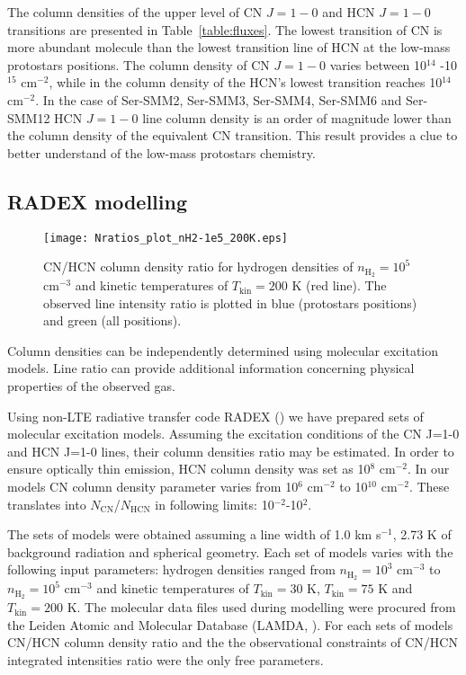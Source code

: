 \documentclass{aa}
\begin{document}
The column densities of the upper level of CN $J=1-0$ and HCN $J=1-0$ transitions are presented in Table~\ref{table:fluxes}. The lowest transition of CN is more abundant molecule than the lowest transition line of HCN at the low-mass protostars positions. The column density of CN $J=1-0$ varies between 10$^{14}$ -10$^{15}$ cm$^{-2}$, while in the column density of the HCN’s lowest transition reaches 10$^{14}$ cm$^{-2}$. In the case of Ser-SMM2, Ser-SMM3, Ser-SMM4, Ser-SMM6 and Ser-SMM12 HCN $J=1-0$ line column density is an order of magnitude lower than the column density of the equivalent CN transition. This result provides a clue to better understand of the low-mass protostars chemistry. 

\subsection{RADEX modelling}

\begin{figure}
   \centering
   \texttt{[image: Nratios\_plot\_nH2-1e5\_200K.eps]}
      \caption{CN/HCN column density ratio for hydrogen densities of $n_\mathrm{H_2} = 10^5$ cm$^{-3}$ and kinetic temperatures of $T_\mathrm{kin} = 200$ K (red line). The observed line intensity ratio is plotted in blue (protostars positions) and green (all positions).}
         \label{1e5_75K}
\end{figure}

Column densities can be independently determined using molecular excitation models. Line ratio can provide additional information concerning physical properties of the observed gas. 

Using non-LTE radiative transfer code RADEX (\citealt{vdT07}) we have prepared sets of molecular excitation models. Assuming the excitation conditions of the CN J=1-0 and HCN J=1-0 lines, their column densities ratio may be estimated. In order to ensure optically thin emission, HCN column density was set as 10$^8$ cm$^{-2}$. In our models CN column density parameter varies from 10$^6$ cm$^{-2}$ to 10$^{10}$ cm$^{-2}$. These translates into $N_\mathrm{CN}$/$N_\mathrm{HCN}$ in following limits: 10$^{-2}$-10$^{2}$. 

The sets of models were obtained assuming a line width of 1.0 km s$^{-1}$, 2.73 K of background radiation and spherical geometry. Each set of models varies with the following input parameters:  hydrogen densities ranged from $n_\mathrm{H_2} = 10^3$ cm$^{-3}$ to $n_\mathrm{H_2} = 10^5$ cm$^{-3}$ and kinetic temperatures of $T_\mathrm{kin} = 30$ K, $T_\mathrm{kin} = 75$ K and $T_\mathrm{kin} =200$ K. The molecular data files used during modelling were procured from the Leiden Atomic and Molecular Database (LAMDA, \citealt{Sch05}). For each sets of models CN/HCN column density ratio and the the observational constraints of CN/HCN integrated intensities ratio were the only free parameters. 
\end{document}
